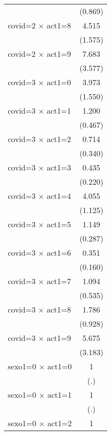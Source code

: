 {\begin{tabular}{l*{1}{c}}
                    &     (0.869)         \\
[1em]
covid=2 $\times$ act1=8&       4.515\sym{***}\\
                    &     (1.575)         \\
[1em]
covid=2 $\times$ act1=9&       7.683\sym{***}\\
                    &     (3.577)         \\
[1em]
covid=3 $\times$ act1=0&       3.973\sym{***}\\
                    &     (1.550)         \\
[1em]
covid=3 $\times$ act1=1&       1.200         \\
                    &     (0.467)         \\
[1em]
covid=3 $\times$ act1=2&       0.714         \\
                    &     (0.340)         \\
[1em]
covid=3 $\times$ act1=3&       0.435         \\
                    &     (0.220)         \\
[1em]
covid=3 $\times$ act1=4&       4.055\sym{***}\\
                    &     (1.125)         \\
[1em]
covid=3 $\times$ act1=5&       1.149         \\
                    &     (0.287)         \\
[1em]
covid=3 $\times$ act1=6&       0.351\sym{*}  \\
                    &     (0.160)         \\
[1em]
covid=3 $\times$ act1=7&       1.094         \\
                    &     (0.535)         \\
[1em]
covid=3 $\times$ act1=8&       1.786         \\
                    &     (0.928)         \\
[1em]
covid=3 $\times$ act1=9&       5.675\sym{**} \\
                    &     (3.183)         \\
[1em]
sexo1=0 $\times$ act1=0&           1         \\
                    &         (.)         \\
[1em]
sexo1=0 $\times$ act1=1&           1         \\
                    &         (.)         \\
[1em]
sexo1=0 $\times$ act1=2&           1         \\

\end{tabular}}
